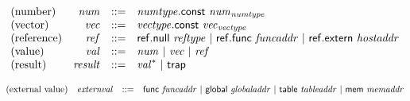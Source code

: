 \vspace{1ex}

\vspace{1ex}

$$
\begin{array}{@{}lrrl@{}l@{}}
\mbox{(number)} & {\mathit{num}} &::=& {\mathit{numtype}}.\mathsf{const}~{{\mathit{num}}}_{{\mathit{numtype}}} \\
\mbox{(vector)} & {\mathit{vec}} &::=& {\mathit{vectype}}.\mathsf{const}~{{\mathit{vec}}}_{{\mathit{vectype}}} \\
\mbox{(reference)} & {\mathit{ref}} &::=& \mathsf{ref.null}~{\mathit{reftype}} ~|~ \mathsf{ref.func}~{\mathit{funcaddr}} ~|~ \mathsf{ref.extern}~{\mathit{hostaddr}} \\
\mbox{(value)} & {\mathit{val}} &::=& {\mathit{num}} ~|~ {\mathit{vec}} ~|~ {\mathit{ref}} \\
\mbox{(result)} & {\mathit{result}} &::=& {{\mathit{val}}^\ast} ~|~ \mathsf{trap} \\
\end{array}
$$

\vspace{1ex}

$$
\begin{array}{@{}lrrl@{}l@{}}
\mbox{(external value)} & {\mathit{externval}} &::=& \mathsf{func}~{\mathit{funcaddr}} ~|~ \mathsf{global}~{\mathit{globaladdr}} ~|~ \mathsf{table}~{\mathit{tableaddr}} ~|~ \mathsf{mem}~{\mathit{memaddr}} \\
\end{array}
$$

\vspace{1ex}

\vspace{1ex}

